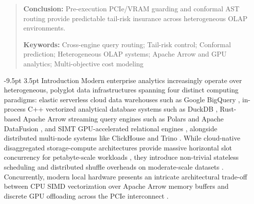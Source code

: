 \documentclass[10pt,a4paper]{article}
\makeatletter
\renewcommand\section{\@startsection{section}{1}{\z@}%
  {-9.5pt \@plus -2pt \@minus -1.5pt}%
  {3.5pt \@plus 1pt}%
  {\normalfont\large\bfseries}}
\makeatother
\begin{document}
\begin{quote}
\textbf{Conclusion:} Pre-execution PCIe/VRAM guarding and conformal AST routing provide predictable tail-risk insurance across heterogeneous OLAP environments.

\noindent\textbf{Keywords:} Cross-engine query routing; Tail-risk control; Conformal prediction; Heterogeneous OLAP systems; Apache Arrow and GPU analytics; Multi-objective cost modeling
\end{quote}

\section{Introduction}
Modern enterprise analytics increasingly operate over heterogeneous, polyglot data infrastructures spanning four distinct computing paradigms: elastic serverless cloud data warehouses such as Google BigQuery \cite{melnik2010dremel, melnik2020dremel, lounissi2025funda}, in-process C++ vectorized analytical database systems such as DuckDB \cite{raasveldt2019duckdb, kuiper2024duckdb_ooc}, Rust-based Apache Arrow streaming query engines such as Polars and Apache DataFusion \cite{lamb2024datafusion}, and SIMT GPU-accelerated relational engines \cite{chrysogelos2019hetexchange, shanbhag2020crystal, bress2013hype}, alongside distributed multi-node systems like ClickHouse \cite{schulze2024clickhouse} and Trino \cite{sethi2019presto}. While cloud-native disaggregated storage-compute architectures provide massive horizontal slot concurrency for petabyte-scale workloads \cite{shojaee2024serverless, abdalla2022bigdata}, they introduce non-trivial stateless scheduling and distributed shuffle overheads on moderate-scale datasets \cite{begoli2018calcite, garcia2008database, lounissi2025funda}. Concurrently, modern local hardware presents an intricate architectural trade-off between CPU SIMD vectorization over Apache Arrow memory buffers and discrete GPU offloading across the PCIe interconnect \cite{milicevic2024dlquery, root2019mapd, kim2022blazingsql}.
\end{document}

